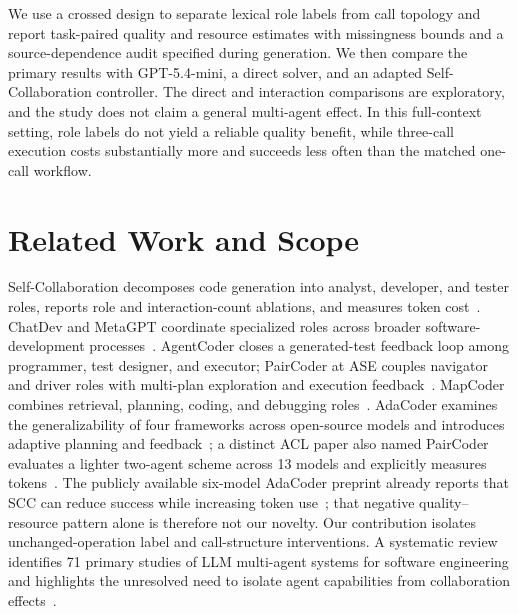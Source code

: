 We use a crossed design to separate lexical role labels from call topology and report task-paired quality and resource estimates with missingness bounds and a source-dependence audit specified during generation. We then compare the primary results with GPT-5.4-mini, a direct solver, and an adapted Self-Collaboration controller. The direct and interaction comparisons are exploratory, and the study does not claim a general multi-agent effect. In this full-context setting, role labels do not yield a reliable quality benefit, while three-call execution costs substantially more and succeeds less often than the matched one-call workflow.

\section{Related Work and Scope}
Self-Collaboration decomposes code generation into analyst, developer, and tester roles, reports role and interaction-count ablations, and measures token cost~\cite{dong2023selfcollaboration}. ChatDev and MetaGPT coordinate specialized roles across broader software-development processes~\cite{qian2024chatdev,hong2024metagpt}. AgentCoder closes a generated-test feedback loop among programmer, test designer, and executor; PairCoder at ASE couples navigator and driver roles with multi-plan exploration and execution feedback~\cite{huang2023agentcoder,zhang2024paircoder}. MapCoder combines retrieval, planning, coding, and debugging roles~\cite{islam2024mapcoder}. AdaCoder examines the generalizability of four frameworks across open-source models and introduces adaptive planning and feedback~\cite{zhu2025adacoderpreprint,zhu2026adacoder}; a distinct ACL paper also named PairCoder evaluates a lighter two-agent scheme across 13 models and explicitly measures tokens~\cite{chen2026paircoder}. The publicly available six-model AdaCoder preprint already reports that SCC can reduce success while increasing token use~\cite{zhu2025adacoderpreprint}; that negative quality--resource pattern alone is therefore not our novelty. Our contribution isolates unchanged-operation label and call-structure interventions. A systematic review identifies 71 primary studies of LLM multi-agent systems for software engineering and highlights the unresolved need to isolate agent capabilities from collaboration effects~\cite{he2025lma}.

